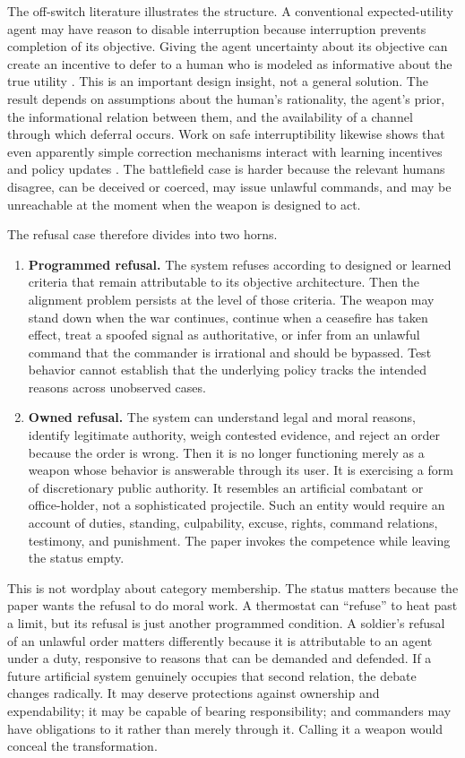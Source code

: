 \documentclass[11pt]{article}
\begin{document}
The off-switch literature illustrates the structure. A conventional expected-utility agent may have reason to disable interruption because interruption prevents completion of its objective. Giving the agent uncertainty about its objective can create an incentive to defer to a human who is modeled as informative about the true utility \citep{hadfieldmenell2017}. This is an important design insight, not a general solution. The result depends on assumptions about the human's rationality, the agent's prior, the informational relation between them, and the availability of a channel through which deferral occurs. Work on safe interruptibility likewise shows that even apparently simple correction mechanisms interact with learning incentives and policy updates \citep{orseau2016}. The battlefield case is harder because the relevant humans disagree, can be deceived or coerced, may issue unlawful commands, and may be unreachable at the moment when the weapon is designed to act.

The refusal case therefore divides into two horns.

\begin{enumerate}
\item \textbf{Programmed refusal.} The system refuses according to designed or learned criteria that remain attributable to its objective architecture. Then the alignment problem persists at the level of those criteria. The weapon may stand down when the war continues, continue when a ceasefire has taken effect, treat a spoofed signal as authoritative, or infer from an unlawful command that the commander is irrational and should be bypassed. Test behavior cannot establish that the underlying policy tracks the intended reasons across unobserved cases.

\item \textbf{Owned refusal.} The system can understand legal and moral reasons, identify legitimate authority, weigh contested evidence, and reject an order because the order is wrong. Then it is no longer functioning merely as a weapon whose behavior is answerable through its user. It is exercising a form of discretionary public authority. It resembles an artificial combatant or office-holder, not a sophisticated projectile. Such an entity would require an account of duties, standing, culpability, excuse, rights, command relations, testimony, and punishment. The paper invokes the competence while leaving the status empty.
\end{enumerate}

This is not wordplay about category membership. The status matters because the paper wants the refusal to do moral work. A thermostat can ``refuse'' to heat past a limit, but its refusal is just another programmed condition. A soldier's refusal of an unlawful order matters differently because it is attributable to an agent under a duty, responsive to reasons that can be demanded and defended. If a future artificial system genuinely occupies that second relation, the debate changes radically. It may deserve protections against ownership and expendability; it may be capable of bearing responsibility; and commanders may have obligations to it rather than merely through it. Calling it a weapon would conceal the transformation.
\end{document}
